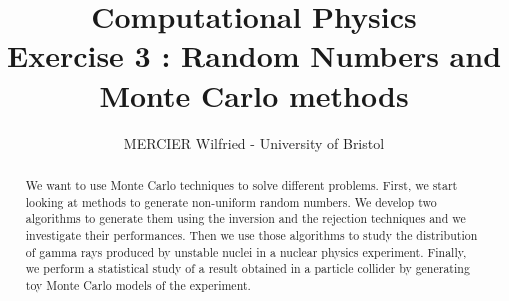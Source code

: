 \documentclass[10 pt]{article}
\numberwithin{equation}{section}
\begin{document}
\title{\LARGE \bf Computational Physics \\ Exercise 3 : Random Numbers and Monte Carlo methods }
\author{MERCIER Wilfried  -  University of Bristol}

\maketitle


\begin{abstract}

We want to use Monte Carlo techniques to solve different problems. First, we start looking at methods to generate non-uniform random numbers. We develop two algorithms to generate them using the inversion and the rejection techniques and we investigate their performances. Then we use those algorithms to study the distribution of gamma rays produced by unstable nuclei in a nuclear physics experiment. Finally, we perform a statistical study of a result obtained in a particle collider by generating toy Monte Carlo models of the experiment.

\end{abstract}
\end{document}

